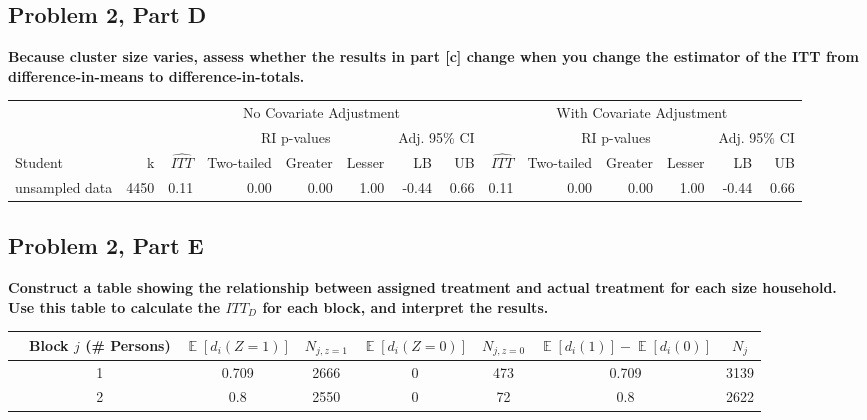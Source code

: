 \documentclass[11pt,notitlepage]{article}
\def\E{\mathop{\mathbb{E}}}
\begin{document}
\clearpage

\subsection{Problem 2, Part D} {\bf Because cluster size varies, assess whether the results in part [c] change when you change the estimator of the ITT from difference-in-means to difference-in-totals.}

\vspace{1cm}

\begin{table}[h!]\scriptsize\onehalfspacing
\begin{center}
\begin{tabular}{lrrrrrrr|rrrrrr}
  \hline
  & & \multicolumn{6}{c|}{No Covariate Adjustment} & \multicolumn{6}{c}{With Covariate Adjustment} \\
  \cline{3-14}
  & & & \multicolumn{3}{c}{RI p-values} & \multicolumn{2}{c|}{Adj. 95\% CI} &  & \multicolumn{3}{c}{RI p-values} & \multicolumn{2}{c}{Adj. 95\% CI} \\
  \cline{4-6}\cline{10-12}
Student & k & $\widehat{ITT}$ & Two-tailed & Greater & Lesser & LB & UB & $\widehat{ITT}$ & Two-tailed & Greater & Lesser & LB & UB \\ 
  \hline
unsampled data & 4450 & 0.11 & 0.00 & 0.00 & 1.00 & -0.44 & 0.66 & 0.11 & 0.00 & 0.00 & 1.00 & -0.44 & 0.66 \\ 
   \hline
\end{tabular}
\end{center}
\end{table}


\subsection{Problem 2, Part E} {\bf Construct a table showing the relationship between assigned treatment and actual treatment for each size household.  Use this table to calculate the $ITT_D$ for each block, and interpret the results.}

\vspace{1cm}

\begin{table}[h!]\small
\begin{center}
\begin{tabular}{rc|cc|cc|cc}
  \hline
 & Block $j$ (\# Persons) & $\E[d_i(Z=1)]$ & $N_{j, z=1}$ & $\E[d_i(Z=0)]$ & $N_{j, z=0}$ & $\E[d_i(1)]-\E[d_i(0)]$ & $N_j$ \\ 
  \hline
 & 1 & 0.709 & 2666 & 0 & 473 & 0.709 & 3139 \\ 
 & 2 & 0.8 & 2550 & 0 & 72 & 0.8 & 2622 \\ 
   \hline
\end{tabular}
\end{center}
\end{table}
\end{document}
